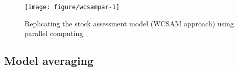 \documentclass[a4paper,english,10pt]{article}\usepackage[]{graphicx}\usepackage[]{color}
\makeatletter
\def\maxwidth{ %
  \ifdim\Gin@nat@width>\linewidth
    \linewidth
  \else
    \Gin@nat@width
  \fi
}
\newenvironment{knitrout}{}{} %
\makeatother
\begin{document}
\begin{knitrout}
\color{fgcolor}\begin{figure}[H]

{\centering \texttt{[image: figure/wcsampar-1]} 

}

\caption[Replicating the stock assessment model (WCSAM approach) using parallel computing]{Replicating the stock assessment model (WCSAM approach) using parallel computing\label{fig:wcsampar}}
\end{figure}


\end{knitrout}







\subsection{Model averaging}
\end{document}
